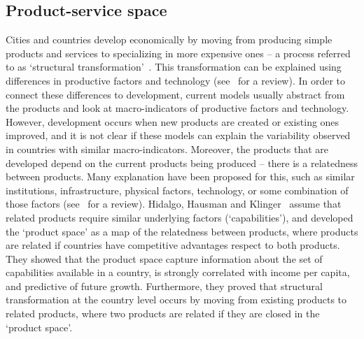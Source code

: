 \subsection{Product-service space}
\label{sec:pss}
Cities and countries develop economically by moving from producing simple products and services to specializing in more expensive ones -- a process referred to as `structural transformation'~\citep{smith1776, Romer1991,grossman1991,hidalgo2007}.
This transformation can be explained using differences in productive factors and technology (see~\citep{hausmann2011} for a review).
In order to connect these differences to development, 
current models usually abstract from the products and look at macro-indicators of productive factors and technology.
However, development occurs when new products are created or existing ones improved,
and it is not clear if these models can explain the variability observed in countries with similar macro-indicators.
Moreover, the products that are developed depend on the current products being produced -- there is a relatedness between products.
Many explanation have been proposed for this, 
such as similar institutions, infrastructure, physical factors, technology, or some combination of those factors (see~\cite{hidalgo2007} for a review).
Hidalgo, Hausman and Klinger~\cite{hidalgo2007, hausmann2011, Hausmann2006,hidalgo2009} assume that related products require similar underlying factors (`capabilities'),
and developed the `product space' as a map of the relatedness between products,
where products are related if countries have competitive advantages respect to both products.
They showed that the product space capture information about the set of capabilities available in a country, 
is strongly correlated with income per capita, 
and predictive of future growth.
Furthermore, they proved that structural transformation at the country level occurs by moving from existing products to related products, 
where two products are related if they are closed in the `product space'.

